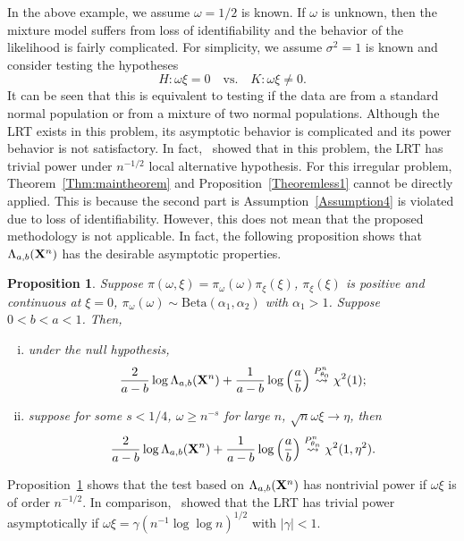 \documentclass[11pt]{article}
\theoremstyle{plain}
\newtheorem{proposition}{\quad\quad Proposition}
\theoremstyle{definition}
\theoremstyle{remark}
\begin{document}
In the above example, we assume $\omega=1/2$ is known.
If $\omega$ is unknown, then the mixture model suffers from loss of identifiability and the behavior of the likelihood is fairly complicated.
For simplicity, we assume $\sigma^2=1$ is known and consider testing the hypotheses
\begin{equation}
    H:\omega \xi=0
    \quad \text{vs.}\quad
    K:\omega \xi \neq 0.
    \label{newHy}
\end{equation}
It can be seen that this is equivalent to testing if the data are from a standard normal population or from a mixture of two normal populations.
Although the LRT exists in this problem, its asymptotic behavior is complicated and its power behavior is not satisfactory.
In fact,~\cite{HALL2005158} showed that in this problem, the LRT has trivial power under $n^{-1/2}$ local alternative hypothesis. 
For this irregular problem, Theorem~\ref{Thm:maintheorem} and Proposition~\ref{Theoremless1} cannot be directly applied.
This is because the second part is Assumption~\ref{Assumption4} is violated due to loss of identifiability.
However, this does not mean that the proposed methodology is not applicable.
In fact, the following proposition shows that $\Lambda_{a,b}(\mathbf{X}^n)$ has the desirable asymptotic properties.

\begin{proposition}
    Suppose $\pi(\omega,\xi)=\pi_{\omega}(\omega) \pi_{\xi}(\xi)$, $\pi_\xi(\xi)$ is positive and continuous at $\xi=0$,
    $\pi_\omega(\omega)\sim \text{Beta}(\alpha_1,\alpha_2)$ with $\alpha_1>1$.
    Suppose $ 0 < b < a < 1 $.
    Then,
    \begin{enumerate}[(i)]
        \item
    under the null hypothesis,
    \begin{equation*}
        \frac{2}{a-b}\log \Lambda_{a,b} (\mathbf{X}^n) + \frac{1}{a-b} \log \left(\frac a b \right) \overset{P^n_{\theta_0}}{\rightsquigarrow}\chi^2(1);
    \end{equation*}
\item
    suppose for some $s<1/4$, $\omega \geq n^{-s}$ for large $n$, $\sqrt{n}\omega \xi \to \eta$, then
    \begin{equation*}
        \frac{2}{a-b} \log \Lambda_{a,b} (\mathbf{X}^n) + \frac{1}{a-b} \log \left(\frac a b \right) \overset{P^n_{\theta_n}}{\rightsquigarrow}  \chi^2(1,\eta^2).
    \end{equation*}
\end{enumerate}
    \label{mixtureThm}
\end{proposition}
Proposition~\ref{mixtureThm} shows that the test based on $\Lambda_{a,b}(\mathbf{X}^n)$ has nontrivial power if $\omega \xi $ is of order $n^{-1/2}$. 
In comparison,~\cite{HALL2005158} showed that the LRT has  trivial power asymptotically if $\omega \xi=\gamma(n^{-1}\log \log n)^{1/2}$ with $|\gamma|< 1$.
\end{document}
